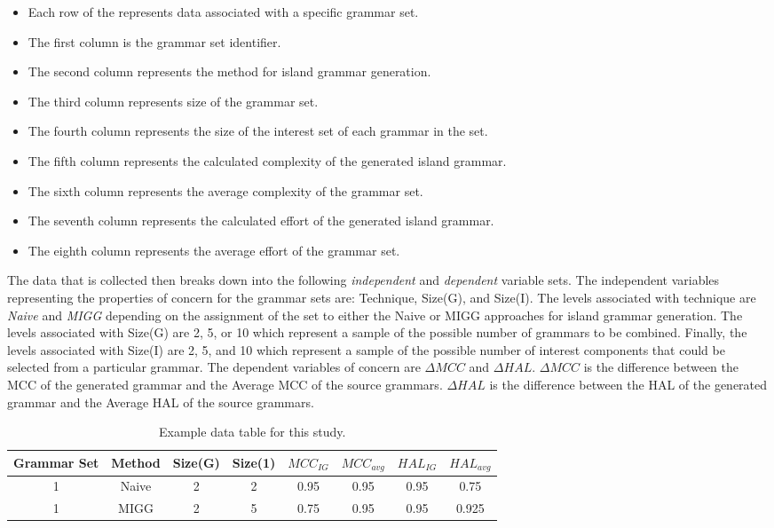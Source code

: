 \documentclass[10pt,nocc]{xrese_report}
\begin{document}
\begin{itemize}
\item Each row of the represents data associated with a specific grammar set.
\item The first column is the grammar set identifier.
\item The second column represents the method for island grammar generation.
\item The third column represents size of the grammar set.
\item The fourth column represents the size of the interest set of each grammar in the set.
\item The fifth column represents the calculated complexity of the generated island grammar.
\item The sixth column represents the average complexity of the grammar set.
\item The seventh column represents the calculated effort of the generated island grammar.
\item The eighth column represents the average effort of the grammar set.
\end{itemize}

The data that is collected then breaks down into the following \textit{independent} and \textit{dependent} variable sets. The independent variables representing the properties of concern for the grammar sets are: Technique, Size(G), and Size(I). The levels associated with technique are \textit{Naive} and \textit{MIGG} depending on the assignment of the set to either the Naive or MIGG approaches for island grammar generation. The levels associated with Size(G) are 2, 5, or 10 which represent a sample of the possible number of grammars to be combined. Finally, the levels associated with Size(I) are 2, 5, and 10 which represent a sample of the possible number of interest components that could be selected from a particular grammar. The dependent variables of concern are $\Delta MCC$ and $\Delta HAL$. $\Delta MCC$ is the difference between the MCC of the generated grammar and the Average MCC of the source grammars. $\Delta HAL$ is the difference between the HAL of the generated grammar and the Average HAL of the source grammars.

\begin{table}[tb]
\centering
\caption{Example data table for this study.}\label{tbl:example}
\begin{tabular}{|c|c|c|c|c|c|c|c|}
\hline
Grammar Set & Method & Size(G) & Size(1) & $MCC_{IG}$ & $MCC_{avg}$ & $HAL_{IG}$ & $HAL_{avg}$\\
\hline
\hline
1 & Naive & 2 & 2 & 0.95 & 0.95 & 0.95 & 0.75\\
\hline
1 & MIGG & 2 & 5 & 0.75 & 0.95 & 0.95 & 0.925\\
\hline
\end{tabular}
\end{table}
\end{document}
